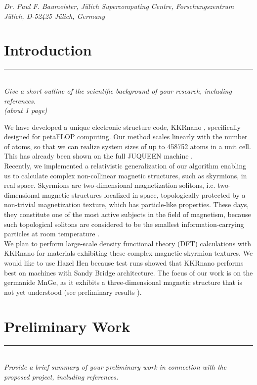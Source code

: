\documentclass [a4paper, 12pt]{article}
\begin{document}
\phantom{MM} \textit{Dr. Paul F. Baumeister,
J\"ulich Supercomputing Centre, Forschungszentrum J\"ulich, D-52425 J\"ulich, Germany
}


\newpage

\vfill
\tableofcontents
\vfill

\newpage



\section{Introduction}
\rule{\textwidth}{0.4pt}\\
\textit{Give a short outline of the scientific background of your research, including references.}\\

\textit{(about 1 page)}

We have developed a unique electronic structure code, 
KKRnano \cite{zeller_towards_2008,thiess_massively_2012},
specifically designed for petaFLOP computing. Our method scales linearly
with the number of atoms, so that we can realize system sizes of up to 
458752 atoms in a unit cell. This has already been shown on the full JUQUEEN
machine \cite{brommel_juqueen_2017}.
\\
Recently, we implemented a relativistic generalization of our algorithm 
enabling us to calculate complex non-collinear magnetic structures, such as skyrmions,
in real space. Skyrmions are two-dimensional magnetization solitons, i.e. two-dimensional
magnetic structures localized in space, topologically protected by a non-trivial
magnetization texture, which has particle-like properties. 
These days, they constitute one of the most active subjects in the field of 
magnetism, because such topological solitons are considered to be the smallest 
information-carrying particles at room temperature \cite{fert_skyrmions_2013,castelvecchi_strange_2017}. 
\\
We plan to perform large-scale density functional theory (DFT) calculations with 
KKRnano for materials exhibiting these complex magnetic skyrmion textures. We would like to use Hazel Hen
because test runs showed that KKRnano performs best on machines with Sandy Bridge
architecture.
The focus of our work is on the germanide MnGe, as it exhibits a three-dimensional magnetic structure
that is not yet understood (see preliminary results
\cite{tanigaki_real-space_2015,bornemann_investigation_2017}).



\section{Preliminary Work}
\rule{\textwidth}{0.4pt}\\
\textit{Provide a brief summary of your preliminary work in connection with the proposed project, including references.}\\
\end{document}
